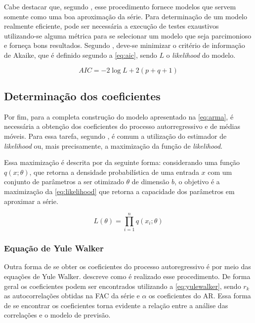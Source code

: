 \documentclass[
    12pt,
    oneside,
    a4paper,
    english,
    brazil
]{abntex2}
\begin{document}
Cabe  destacar  que,  segundo  ,  esse  procedimento  fornece
modelos que servem somente como uma boa aproximação da série. Para determinação
de um  modelo realmente  eficiente, pode  ser necessária  a execução  de testes
exaustivos utilizando-se alguma  métrica para se selecionar um  modelo que seja
parcimonioso  e  forneça  bons resultados.  Segundo  ,  deve-se
minimizar  o  critério de  informação  de  Akaike,  que  é definido  segundo  a
\autoref{eq:aic}, sendo $L$ o \textit{likelihood} do modelo.

\begin{equation}
    \label{eq:aic}
    AIC = -2\log{L}+2(p+q+1)
\end{equation}

\subsection{Determinação dos coeficientes}

Por fim, para a completa construção do modelo apresentado na \autoref{eq:arma},
é  necessária a  obtenção dos  coeficientes  do processo  autorregressivo e  de
médias  móveis.  Para  essa  tarefa,  segundo  ,  é  comum  a
utilização  do  estimador  de  \textit{likelihood}  ou,  mais  precisamente,  a
maximização da função de \textit{likelihood}.

Essa maximização  é descrita  por  da  seguinte forma:
considerando uma  função $q(x;\theta)$, que retorna  a densidade probabilística
de uma entrada  $x$ com um conjunto  de parâmetros a ser  otimizado $\theta$ de
dimensão $b$, o objetivo é a maximização da \autoref{eq:likelihood} que retorna
a capacidade dos parâmetros em aproximar a série.

\begin{equation}\label{eq:likelihood}
    L(\theta) = \prod_{i=1}^{n}{q(x_i;\theta)}
\end{equation}

\subsubsection{Equação de Yule Walker}

Outra forma de  se obter os coeficientes do processo  autoregressivo é por meio
das equações de Yule Walker.   descreve como é realizado esse
procedimento. De forma geral os coeficientes podem ser encontrados utilizando a
\autoref{eq:yulewalker}, sendo $r_k$ as autocorrelações obtidas na FAC da série
e $\alpha$ os coeficientes do AR\@.  Essa forma de se encontrar os coeficientes
torna  evidente  a relação  entre  a  análise das  correlações  e  o modelo  de
previsão.
\end{document}
